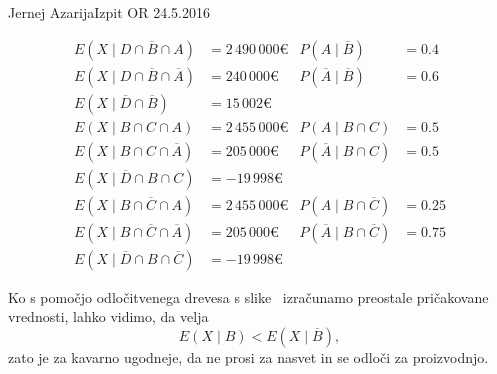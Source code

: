 \begin{naloga}{Jernej Azarija}{Izpit OR 24.5.2016}
\begin{odgovor}
\begin{align*}
E(X \mid D \cap \overline{B} \cap A) &= 2\,490\,000 € &
P(A \mid \overline{B}) &= 0.4 \\
E(X \mid D \cap \overline{B} \cap \overline{A}) &= 240\,000 € &
P(\overline{A} \mid \overline{B})& = 0.6 \\
E(X \mid \overline{D} \cap \overline{B}) &= 15\,002 € \\[1ex]
E(X \mid B \cap C \cap A) &=2\,455\,000 € &
P(A \mid B \cap C) &= 0.5 \\
E(X \mid B \cap C \cap \overline{A}) &=205\,000 € &
P(\overline{A} \mid B \cap C) &= 0.5 \\
E(X \mid \overline{D} \cap B \cap C) &= -19\,998 € \\[1ex]
E(X \mid B \cap \overline{C} \cap A) &=2\,455\,000 € &
P(A \mid B \cap \overline{C}) &= 0.25 \\
E(X \mid B \cap \overline{C} \cap \overline{A}) &=205\,000 € &
P(\overline{A} \mid B \cap \overline{C}) &= 0.75 \\
E(X \mid \overline{D} \cap B \cap \overline{C}) &= -19\,998 €
\end{align*}


Ko s pomočjo odločitvenega drevesa s slike~\fig
izračunamo preostale pričakovane vrednosti,
lahko vidimo, da velja
$$
E(X \mid B) < E(X \mid \overline{B}) ,
$$
zato je za kavarno ugodneje,
da ne prosi za nasvet in se odloči za proizvodnjo.

\begin{slika}
\makebox[\textwidth][c]{
\pgfslika
}
\end{slika}
\end{odgovor}
\end{naloga}
